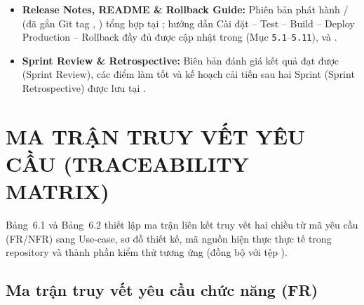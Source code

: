 \documentclass[12pt,a4paper]{report}
\begin{document}
\begin{itemize}[leftmargin=*]
\item \textbf{Release Notes, README \& Rollback Guide:} Phiên bản phát hành  /  (đã gắn Git tag , ) tổng hợp tại ; hướng dẫn Cài đặt -- Test -- Build -- Deploy Production -- Rollback đầy đủ được cập nhật trong  (Mục \texttt{5.1}--\texttt{5.11}),  và .
\item \textbf{Sprint Review \& Retrospective:} Biên bản đánh giá kết quả đạt được (Sprint Review), các điểm làm tốt và kế hoạch cải tiến sau hai Sprint (Sprint Retrospective) được lưu tại .
\end{itemize}

\chapter{MA TRẬN TRUY VẾT YÊU CẦU (TRACEABILITY MATRIX)}

Bảng~6.1 và Bảng~6.2 thiết lập ma trận liên kết truy vết hai chiều từ mã yêu cầu (FR/NFR) sang Use-case, sơ đồ thiết kế, mã nguồn hiện thực thực tế trong repository và thành phần kiểm thử tương ứng (đồng bộ với tệp ).

\section{Ma trận truy vết yêu cầu chức năng (FR)}
\end{document}
